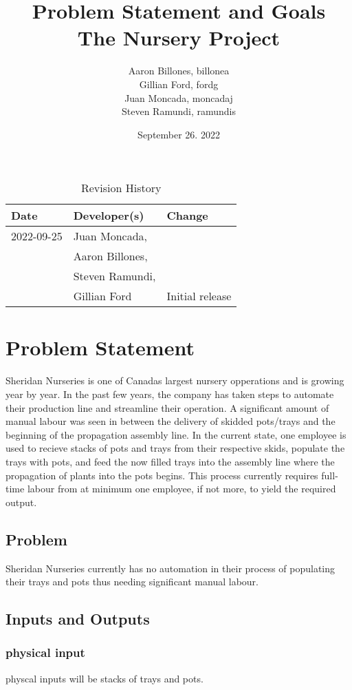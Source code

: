 \documentclass{article}
\title{Problem Statement and Goals\\The Nursery Project}
\author{Aaron Billones, billonea\\Gillian Ford, fordg\\Juan Moncada, moncadaj\\Steven Ramundi, ramundis}
\date{September 26. 2022}
\begin{document}
\maketitle

\begin{table}[hp]
\caption{Revision History} \label{TblRevisionHistory}
\begin{tabularx}{\textwidth}{llX}
\toprule
\textbf{Date} & \textbf{Developer(s)} & \textbf{Change}\\
\midrule
2022-09-25 & Juan Moncada,\\&Aaron Billones,\\&Steven Ramundi,\\&Gillian Ford & Initial release\\
 
\bottomrule
\end{tabularx}
\end{table}

\newpage

\section{Problem Statement}

Sheridan Nurseries is one of Canadas largest nursery opperations and is growing year by year.
In the past few years, the company has taken steps to automate their production line and streamline their operation.
A significant amount of manual labour was seen in between the delivery of skidded pots/trays and the beginning of the propagation 
assembly line. In the current state, one employee is used to recieve stacks of pots and trays from their respective skids,
populate the trays with pots, and feed the now filled trays into the assembly line where the propagation of plants into the pots begins.
This process currently requires full-time labour from at minimum one employee, if not more, to yield the required output.

\subsection{Problem}
Sheridan Nurseries currently has no automation in their process of populating their trays and pots thus needing significant manual labour.

\subsection{Inputs and Outputs}
\subsubsection{physical input}
physcal inputs will be stacks of trays and pots.
\end{document}
